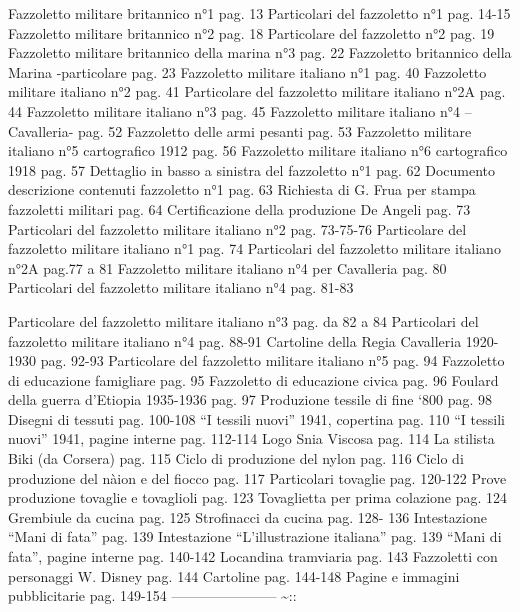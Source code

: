 Fazzoletto militare britannico n°1 pag. 13 Particolari del fazzoletto
n°1 pag. 14-15 Fazzoletto militare britannico n°2 pag. 18 Particolare
del fazzoletto n°2 pag. 19 Fazzoletto militare britannico della marina
n°3 pag. 22 Fazzoletto britannico della Marina -particolare pag. 23
Fazzoletto militare italiano n°1 pag. 40 Fazzoletto militare italiano
n°2 pag. 41 Particolare del fazzoletto militare italiano n°2A pag. 44
Fazzoletto militare italiano n°3 pag. 45 Fazzoletto militare italiano
n°4 --Cavalleria- pag. 52 Fazzoletto delle armi pesanti pag. 53
Fazzoletto militare italiano n°5 cartografico 1912 pag. 56 Fazzoletto
militare italiano n°6 cartografico 1918 pag. 57 Dettaglio in basso a
sinistra del fazzoletto n°1 pag. 62 Documento descrizione contenuti
fazzoletto n°1 pag. 63 Richiesta di G. Frua per stampa fazzoletti
militari pag. 64 Certificazione della produzione De Angeli pag. 73
Particolari del fazzoletto militare italiano n°2 pag. 73-75-76
Particolare del fazzoletto militare italiano n°1 pag. 74 Particolari del
fazzoletto militare italiano n°2A pag.77 a 81 Fazzoletto militare
italiano n°4 per Cavalleria pag. 80 Particolari del fazzoletto militare
italiano n°4 pag. 81-83

Particolare del fazzoletto militare italiano n°3 pag. da 82 a 84
Particolari del fazzoletto militare italiano n°4 pag. 88-91 Cartoline
della Regia Cavalleria 1920-1930 pag. 92-93 Particolare del fazzoletto
militare italiano n°5 pag. 94 Fazzoletto di educazione famigliare pag.
95 Fazzoletto di educazione civica pag. 96 Foulard della guerra
d'Etiopia 1935-1936 pag. 97 Produzione tessile di fine `800 pag. 98
Disegni di tessuti pag. 100-108 ``I tessili nuovi'' 1941, copertina pag.
110 ``I tessili nuovi'' 1941, pagine interne pag. 112-114 Logo Snia
Viscosa pag. 114 La stilista Biki (da Corsera) pag. 115 Ciclo di
produzione del nylon pag. 116 Ciclo di produzione del nàion e del fiocco
pag. 117 Particolari tovaglie pag. 120-122 Prove produzione tovaglie e
tovaglioli pag. 123 Tovaglietta per prima colazione pag. 124 Grembiule
da cucina pag. 125 Strofinacci da cucina pag. 128- 136 Intestazione
``Mani di fata'' pag. 139 Intestazione ``L'illustrazione italiana'' pag.
139 ``Mani di fata'', pagine interne pag. 140-142 Locandina tramviaria
pag. 143 Fazzoletti con personaggi W. Disney pag. 144 Cartoline pag.
144-148 Pagine e immagini pubblicitarie pag. 149-154
----------------------- \textasciitilde{}::
